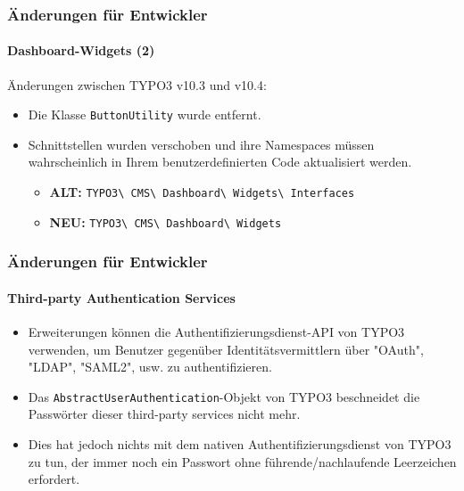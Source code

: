 \begin{frame}[fragile]
	\frametitle{Änderungen für Entwickler}
	\framesubtitle{Dashboard-Widgets (2)}

	Änderungen zwischen TYPO3 v10.3 und v10.4:

	\begin{itemize}
		\item Die Klasse \texttt{ButtonUtility} wurde entfernt.
		\item Schnittstellen wurden verschoben und ihre Namespaces müssen wahrscheinlich
			in Ihrem benutzerdefinierten Code aktualisiert werden.
			\begin{itemize}\smaller
				\item \textbf{ALT:}
					\texttt{TYPO3\textbackslash
						CMS\textbackslash
						Dashboard\textbackslash
						Widgets\textbackslash
						Interfaces}
				\item \textbf{NEU:}
					\texttt{TYPO3\textbackslash
						CMS\textbackslash
						Dashboard\textbackslash
						Widgets}
			\end{itemize}\normalsize
	\end{itemize}

\end{frame}


\begin{frame}[fragile]
	\frametitle{Änderungen für Entwickler}
	\framesubtitle{Third-party Authentication Services}

	\begin{itemize}

		\item Erweiterungen können die Authentifizierungsdienst-API von TYPO3 verwenden, um Benutzer gegenüber
			Identitätsvermittlern über "OAuth", "LDAP", "SAML2", usw. zu authentifizieren.
		\item Das \texttt{AbstractUserAuthentication}-Objekt von TYPO3 beschneidet die Passwörter
			dieser third-party services nicht mehr.
		\item Dies hat jedoch nichts mit dem nativen Authentifizierungsdienst von TYPO3 zu tun,
			der immer noch ein Passwort ohne führende/nachlaufende Leerzeichen erfordert.

	\end{itemize}

\end{frame}

